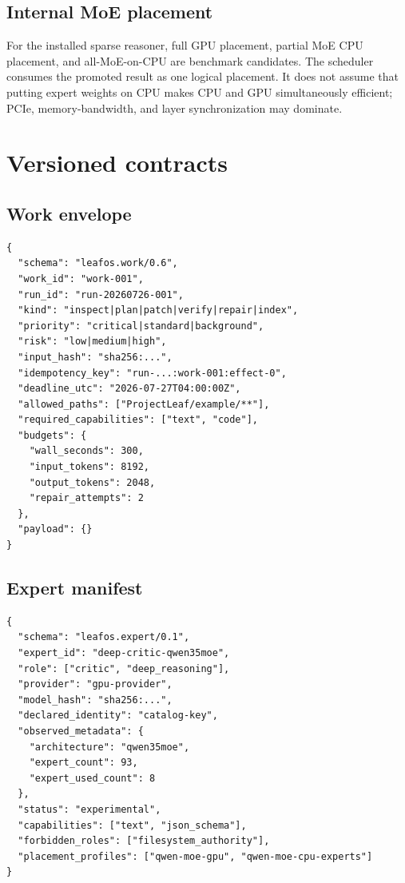 \documentclass[11pt,letterpaper]{article}
\begin{document}
\subsection{Internal MoE placement}

For the installed sparse reasoner, full GPU placement, partial MoE CPU
placement, and all-MoE-on-CPU are benchmark candidates. The scheduler consumes
the promoted result as one logical placement. It does not assume that putting
expert weights on CPU makes CPU and GPU simultaneously efficient; PCIe,
memory-bandwidth, and layer synchronization may dominate.

\section{Versioned contracts}

\subsection{Work envelope}

\begin{lstlisting}
{
  "schema": "leafos.work/0.6",
  "work_id": "work-001",
  "run_id": "run-20260726-001",
  "kind": "inspect|plan|patch|verify|repair|index",
  "priority": "critical|standard|background",
  "risk": "low|medium|high",
  "input_hash": "sha256:...",
  "idempotency_key": "run-...:work-001:effect-0",
  "deadline_utc": "2026-07-27T04:00:00Z",
  "allowed_paths": ["ProjectLeaf/example/**"],
  "required_capabilities": ["text", "code"],
  "budgets": {
    "wall_seconds": 300,
    "input_tokens": 8192,
    "output_tokens": 2048,
    "repair_attempts": 2
  },
  "payload": {}
}
\end{lstlisting}

\subsection{Expert manifest}

\begin{lstlisting}
{
  "schema": "leafos.expert/0.1",
  "expert_id": "deep-critic-qwen35moe",
  "role": ["critic", "deep_reasoning"],
  "provider": "gpu-provider",
  "model_hash": "sha256:...",
  "declared_identity": "catalog-key",
  "observed_metadata": {
    "architecture": "qwen35moe",
    "expert_count": 93,
    "expert_used_count": 8
  },
  "status": "experimental",
  "capabilities": ["text", "json_schema"],
  "forbidden_roles": ["filesystem_authority"],
  "placement_profiles": ["qwen-moe-gpu", "qwen-moe-cpu-experts"]
}
\end{lstlisting}
\end{document}
